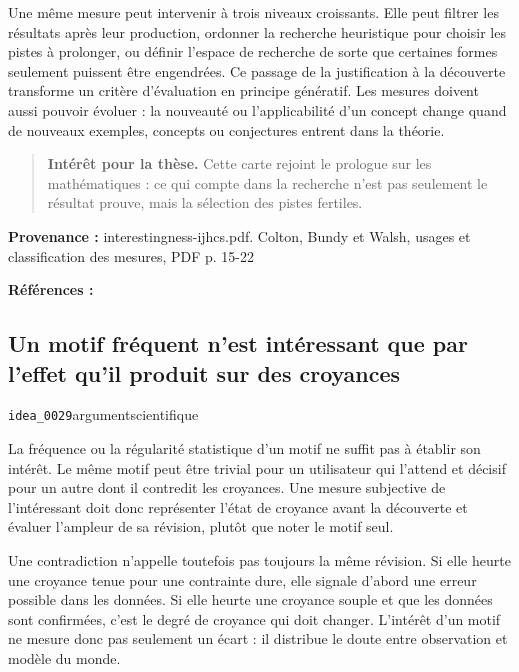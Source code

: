\documentclass[10pt,a4paper]{article}
\begin{document}
Une même mesure peut intervenir à trois niveaux croissants. Elle peut filtrer les résultats après leur production, ordonner la recherche heuristique pour choisir les pistes à prolonger, ou définir l'espace de recherche de sorte que certaines formes seulement puissent être engendrées. Ce passage de la justification à la découverte transforme un critère d'évaluation en principe génératif. Les mesures doivent aussi pouvoir évoluer : la nouveauté ou l'applicabilité d'un concept change quand de nouveaux exemples, concepts ou conjectures entrent dans la théorie.

\begin{quote}
\textbf{Intérêt pour la thèse.} Cette carte rejoint le prologue sur les mathématiques : ce qui compte dans la recherche n'est pas seulement le résultat prouve, mais la sélection des pistes fertiles.
\end{quote}
{\footnotesize\color{metadata}\textbf{Provenance :} interestingness-ijhcs.pdf. Colton, Bundy et Walsh, usages et classification des mesures, PDF p. 15-22\par}
{\footnotesize\color{metadata}\textbf{Références :} \parencite{colton2000interestingness}\par}

\subsection{Un motif fréquent n'est intéressant que par l'effet qu'il produit sur des croyances}
{\small\color{metadata} \texttt{idea\_0029}\quad\textbullet\quad argument\quad\textbullet\quad scientifique\par}

La fréquence ou la régularité statistique d'un motif ne suffit pas à établir son intérêt. Le même motif peut être trivial pour un utilisateur qui l'attend et décisif pour un autre dont il contredit les croyances. Une mesure subjective de l'intéressant doit donc représenter l'état de croyance avant la découverte et évaluer l'ampleur de sa révision, plutôt que noter le motif seul.

Une contradiction n'appelle toutefois pas toujours la même révision. Si elle heurte une croyance tenue pour une contrainte dure, elle signale d'abord une erreur possible dans les données. Si elle heurte une croyance souple et que les données sont confirmées, c'est le degré de croyance qui doit changer. L'intérêt d'un motif ne mesure donc pas seulement un écart : il distribue le doute entre observation et modèle du monde.
\end{document}
